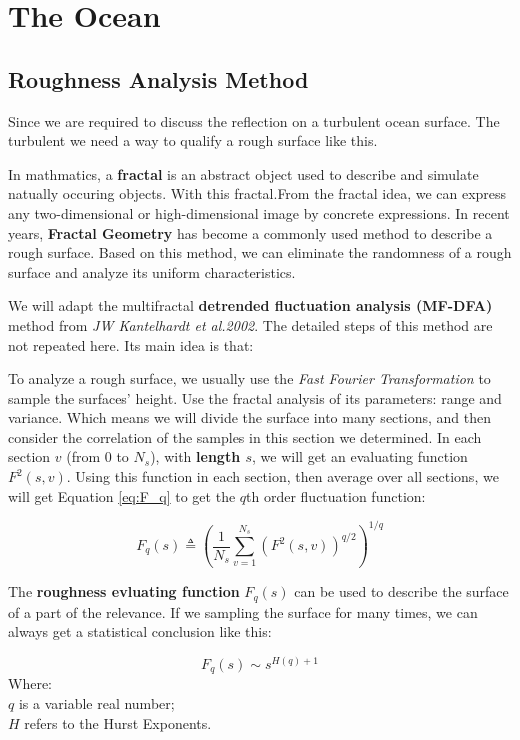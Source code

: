 \documentclass{mcmthesis}
\begin{document}
\section{The Ocean}

  \subsection{Roughness Analysis Method}
    Since we are required to discuss the reflection on a turbulent ocean surface. The turbulent  we need a way to qualify a rough surface like this.

    In mathmatics, a \textbf{fractal} is an abstract object used to describe and simulate natually occuring objects. With this fractal.From the fractal idea, we can express any two-dimensional or high-dimensional image by concrete expressions. In recent years, \textbf{Fractal Geometry} has become a commonly used method to describe a rough surface\cite{lang2015hydraulic,shibuichi1998super}. Based on this method, we can eliminate the randomness of a rough surface and analyze its uniform characteristics.

    We will adapt the multifractal \textbf{detrended fluctuation analysis (MF-DFA)} method from \emph{JW Kantelhardt et al.2002}\cite{kantelhardt2002multifractal}. The detailed steps of this method are not repeated here. Its main idea is that:

    To analyze a rough surface, we usually use the \emph{Fast Fourier Transformation} to sample the surfaces' height. Use the fractal analysis of its parameters: range and variance. Which means we will divide the surface into many sections, and then consider the correlation of the samples in this section we determined. In each section $v$ (from $0$ to $N_s$), with \textbf{length $s$}, we will get an evaluating function $F^2(s,v)$. Using this function in each section, then average over all sections, we will get Equation \ref{eq:F_q} to get the $q$th order fluctuation function:

    \begin{equation}\label{eq:F_q}
      F_q(s) \triangleq (\frac{1}{N_s}\sum_{v=1}^{N_s}(F^2(s,v))^{q/2})^{1/q}
    \end{equation}

    The \textbf{roughness evluating function} $F_q(s)$ can be used to describe the surface of a part of the relevance. If we sampling the surface for many times, we can always get a statistical conclusion like this:

    \begin{equation}\label{eq:F_qq}
      F_q(s) \sim s^{H(q) + 1}
    \end{equation}
    Where:\\
    $q$ is a variable real number;\\
    $H$ refers to the Hurst Exponents.
\end{document}
